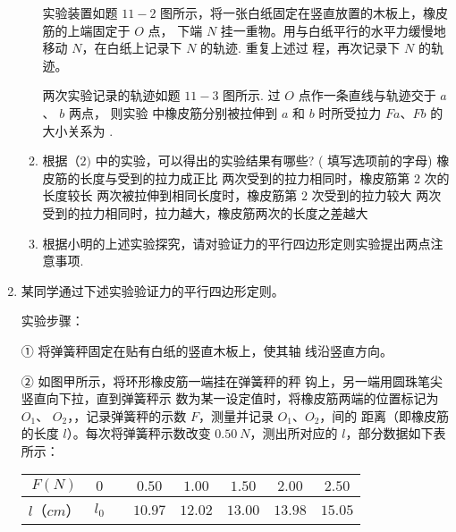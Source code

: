 \begin{enumerate}
\begin{enumerate}
实验装置如题 $ 11-2 $ 图所示，将一张白纸固定在竖直放置的木板上，橡皮筋的上端固定于 $ O $ 点，
下端 $ N $ 挂一重物。用与白纸平行的水平力缓慢地移动 $ N $，在白纸上记录下 $ N $ 的轨迹. 重复上述过
程，再次记录下 $ N $ 的轨迹。

两次实验记录的轨迹如题 $ 11-3 $ 图所示. 过 $ O $ 点作一条直线与轨迹交于 $ a $、 $ b $ 两点， 则实验
中橡皮筋分别被拉伸到 $ a $ 和 $ b $ 时所受拉力 $ Fa $、$ Fb $ 的大小关系为
.

\item 
根据（$ 2) $ 中的实验，可以得出的实验结果有哪些?  ( 填写选项前的字母)
\fourchoices
{橡皮筋的长度与受到的拉力成正比}
{两次受到的拉力相同时，橡皮筋第 $ 2 $ 次的长度较长}
{两次被拉伸到相同长度时，橡皮筋第 $ 2 $ 次受到的拉力较大}
{两次受到的拉力相同时，拉力越大，橡皮筋两次的长度之差越大}



\item 
根据小明的上述实验探究，请对验证力的平行四边形定则实验提出两点注意事项.


\end{enumerate}

\banswer{

}



\newpage
\item
{}
某同学通过下述实验验证力的平行四边形定则。
\begin{figure}[h!]
\centering

\end{figure}

实验步骤：

①
将弹簧秤固定在贴有白纸的竖直木板上，使其轴
线沿竖直方向。


②
如图甲所示，将环形橡皮筋一端挂在弹簧秤的秤
钩上，另一端用圆珠笔尖竖直向下拉，直到弹簧秤示
数为某一设定值时，将橡皮筋两端的位置标记为 $ O_{1} $、
$ O_{2} $，，记录弹簧秤的示数 $ F $，测量并记录 $ O_{1} $、$ O_{2} $，间的
距离（即橡皮筋的长度 $ l $）。每次将弹簧秤示数改变 $ 0.50 \ N $，测出所对应的 $ l $，部分数据如下表所示：
\begin{table}[h!]
\centering 
\begin{tabular}{|c|c|c|c|c|c|c|c|}
\hline 
$ F(N) $ & $ 0 $ & & $ 0.50 $ & $ 1.00 $ & $ 1.50 $ & $ 2.00 $ & $ 2.50 $
 \\
\hline
$ l $（$ cm $） & $ l_{0} $ & & $ 10.97 $ & $ 12.02 $ & $ 13.00 $ & $ 13.98 $ & $ 15.05 $\\ 
\hline 
\end{tabular}
\end{table} 






\end{enumerate}
